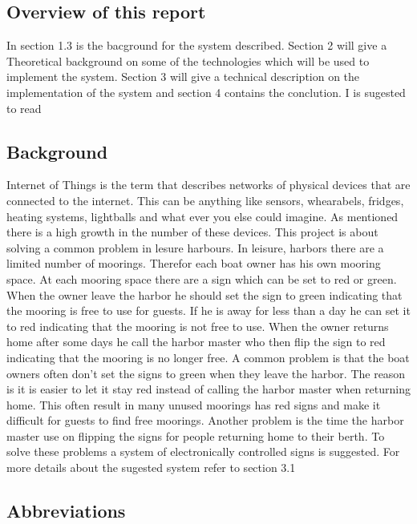 \documentclass[a4paper,12pt,english]{article}
\begin{document}
\subsection{Overview of this report}
In section 1.3 is the bacground for the system described. Section 2 will give a
Theoretical background on some of the technologies which will be used
to implement the system. Section 3 will give a technical description on the
implementation of the system and section 4 contains the conclution. I is
sugested to read 
\subsection{Background}
Internet of Things is the term that describes networks of physical devices that
are connected to the internet. This can be anything like sensors, whearabels,
fridges, heating systems, lightballs and what ever you else could imagine. As
mentioned there is a high growth in the number of these devices. This project
is about solving a common problem in lesure harbours. 
In leisure, harbors there are a limited number of moorings. Therefor each boat
owner has his own mooring space. At each mooring space there are a sign which
can be set to red or green. When the owner leave the harbor he should set the
sign to green indicating that the mooring is free to use for guests. If he is
away for less than a day he can set it to red indicating that the mooring is
not free to use. When the owner returns home after some days he call the harbor
master who then flip the sign to red indicating that the mooring is no longer
free. A common problem is that the boat owners often don’t set the signs to
green when they leave the harbor. The reason is it is easier to let it stay red
instead of calling the harbor master when returning home. This often result in
many unused moorings has red signs and make it difficult for guests to find
free moorings. Another problem is the time the harbor master use on flipping
the signs for people returning home to their berth.
To solve these problems a system of electronically controlled signs is
suggested. For more details about the sugested system refer to section 3.1


{\clearpage
\subsection{Abbreviations}
\renewcommand\thepage{}
\renewcommand{\nomname}{}
\renewcommand{\pagedeclaration}[1]{}
\pagestyle{empty}
\printnomenclature[3cm]
\clearpage}
\end{document}
